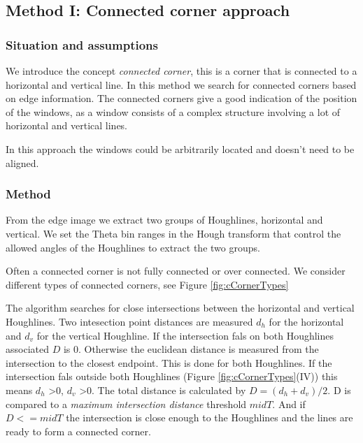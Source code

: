 \subsection{Method I: Connected corner approach} 
\subsubsection{Situation and assumptions}
We introduce the concept \emph{connected corner}, this is a corner that is 
connected to a horizontal and vertical line.  
In this method we search for connected corners based on edge information.
The connected corners give a good indication of the position of the windows, as 
a window consists of a complex structure involving a lot of horizontal and vertical lines.

In this approach the windows could be arbitrarily located and doesn't need
to be aligned.

\subsubsection{Method}
From the edge image we extract two groups of Houghlines, horizontal and
vertical.  We set the Theta bin ranges in the Hough transform that control the
allowed angles of the Houghlines to extract the two groups.

Often a connected corner is not fully connected or over connected.
We consider different types of connected corners, see Figure \ref{fig:cCornerTypes} 

The algorithm searches for close intersections between the horizontal and vertical
Houghlines.  
Two intesection point distances are measured $d_h$ for the horizontal and $d_v$
for the vertical Houghline.  If the intersection fals on both Houghlines
	associated $D$ is 0.  Otherwise the euclidean distance is measured from the
	intersection to the closest endpoint. This is done for both Houghlines.  If
	the intersection fals outside both Houghlines (Figure
	\ref{fig:cCornerTypes}(IV)) this means $d_h$ >0, $d_v$ >0.  The total
	distance is calculated by $D=(d_h + d_v)/2$.  D is compared to
	a \emph{maximum intersection distance} threshold $midT$.  And if $D<=midT$
	the intersection is close enough to the Houghlines and the lines are ready
	to form a connected corner.\\

